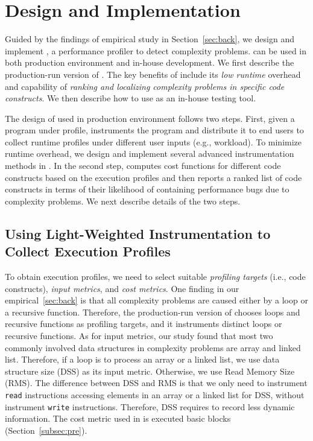 \section{\Tool Design and Implementation}
\label{sec:online}


Guided by the findings of empirical study in Section~\ref{sec:back},
we design and implement \Tool, a performance 
profiler to detect complexity problems. \Tool
can be used in both production environment 
and in-house development. We first describe
the production-run version of \Tool. 
The key benefits of \Tool include its \emph{low runtime} overhead and  capability of \emph{ranking 
and localizing complexity problems in specific code constructs}. 
We then describe how to use \Tool as an in-house testing tool. 

The design of \Tool used in production environment 
follows two steps. First, given a program under profile,
\Tool instruments the program and
distribute it to end users to collect runtime profiles
under different user inputs (e.g., workload). 
To minimize runtime overhead, we design and implement
several advanced instrumentation methods in \Tool. 
In the second step, \Tool computes cost functions for
different code constructs based on the execution profiles
and then reports a ranked list of code constructs in
terms of their likelihood of containing performance bugs due to
complexity problems.  We next describe details of the two steps. 


\subsection{Using Light-Weighted Instrumentation to Collect
Execution Profiles}

To obtain execution profiles, we need to select suitable \emph{profiling targets} (i.e.,
code constructs), \emph{input metrics}, and \emph{cost metrics}. 
One finding in our empirical~\ref{sec:back} is that  all complexity problems are 
caused either by a loop or a recursive function. 
Therefore, the production-run version of \Tool chooses loops 
and recursive functions as profiling targets, 
and it instruments distinct loops or recursive functions. 
As for input metrics, our study found that  most two commonly involved 
data structures in complexity problems 
are array and linked list. Therefore, if a loop is to process an array 
or a linked list, we use data structure size (DSS) as its input metric. Otherwise, we use Read Memory Size (RMS). 
The difference between DSS and RMS is that 
we only need to instrument \texttt{read} instructions  accessing elements 
in an array or a linked list for DSS,  without instrument \texttt{write} instructions.
Therefore, DSS requires to record less dynamic information. 
The cost metric used in \Tool is executed basic blocks (Section~\ref{subsec:pre}).

